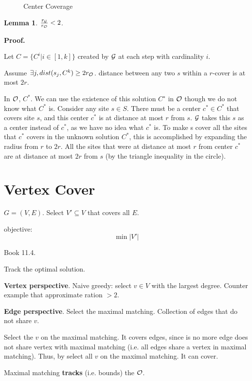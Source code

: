\documentclass[a4paper]{report}
\theoremstyle{definition}
\newtheorem{lem}{Lemma}[section]
\begin{document}
\begin{figure}[!htp]
\centering
{}
\caption{Center Coverage}
\label{fig:11_4}
\end{figure}

\begin{lem}
$\frac{r_{\mathcal{G}}}{r_{\mathcal{O}}}<2$.
\end{lem}

\textbf{Proof.}

Let $C=\{C^i | i\in[1, k]\}$ created by $\mathcal{G}$ at each step with cardinality $i$.

Assume $\exists j, dist(s_j, C^k)\geq 2r_{\mathcal{O}}$. distance between any two $s$ within a $r$-cover is at most $2r$.

In $\mathcal{O}$, $C^*$. We can use the existence of this solution $C^∗$ in $\mathcal{O}$ though we do not know what $C^*$ is. Consider any site $s \in S$. There must be a center $c^* \in C^*$ that covers site $s$, and this center $c^*$ is at distance at most $r$ from $s$. $\mathcal{G}$ takes this $s$ as a center instead of $c^*$, as we have no idea what $c^*$ is. To make s cover all the sites that $c^*$ covers in the unknown solution $C^*$, this is accomplished by expanding the radius from $r$ to $2r$. All the sites that were at distance at most $r$ from center $c^*$ are at distance at most $2r$ from $s$ (by the triangle inequality in the circle).

\section{Vertex Cover}
$G=(V, E)$. Select $V'\subseteq V$ that covers all $E$.

objective:
$$\min |V'|$$

Book 11.4.

Track the optimal solution.

\textbf{Vertex perspective}. Naive greedy: select $v\in V$ with the largest degree. Counter example that approximate ration $>2$.

\textbf{Edge perspective}. Select the maximal matching. Collection of edges that do not share $v$.

Select the $v$ on the maximal matching. It covers edges, since is no more edge does not share vertex with maximal matching (i.e. all edges share a vertex in maximal matching). Thus, by select all $v$ on the maximal matching. It can cover.

Maximal matching \textbf{tracks} (i.e. bounds) the $\mathcal{O}$.
\end{document}
